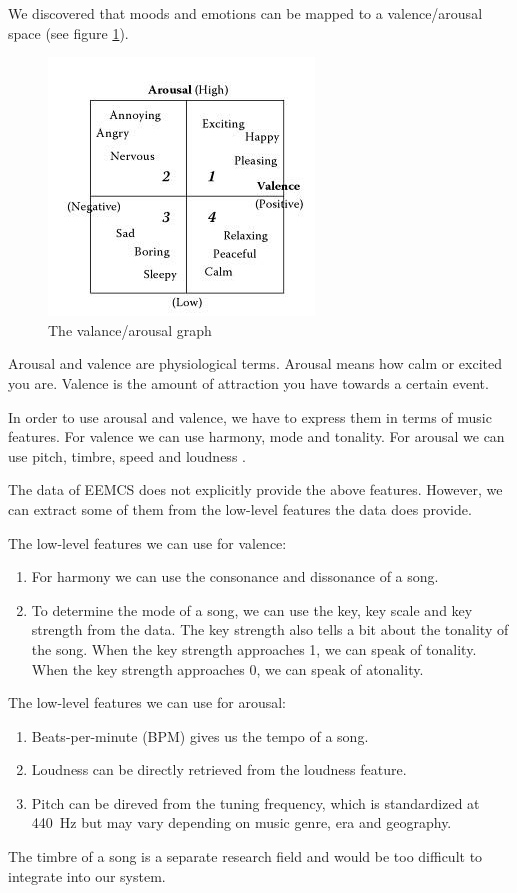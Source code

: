 \documentclass[10pt,a4paper]{article}
\begin{document}
We discovered that moods and emotions can be mapped to a valence/arousal space (see figure \ref{fig:avgraph}).

\begin{figure}[h]
\center
\includegraphics[scale=0.75]{../avgraph.jpg}
\caption{The valance/arousal graph \cite{Book}}
\endcenter
\label{fig:avgraph}

\end{figure}

Arousal and valence are physiological terms.
Arousal means how calm or excited you are.
Valence is the amount of attraction you have towards a certain event.

In order to use arousal and valence, we have to express them in terms of music features.
For valence we can use harmony, mode and tonality.
For arousal we can use pitch, timbre, speed and loudness \cite{PresentationMER}\cite{PaperME}.

\newpage

The data of EEMCS does not explicitly provide the above features. However, we can extract some of them from the low-level features the data does provide.

The low-level features we can use for valence:
\begin{enumerate}
\item For harmony we can use the consonance and dissonance of a song.
\item To determine the mode of a song, we can use the key, key scale and key strength from the data.
The key strength also tells a bit about the tonality of the song.
When the key strength approaches 1, we can speak of tonality. When the key strength approaches 0, we can speak of atonality.
\end{enumerate}
The low-level features we can use for arousal:
\begin{enumerate}
\item Beats-per-minute (BPM) gives us the tempo of a song.
\item Loudness can be directly retrieved from the loudness feature.
\item Pitch can be direved from the tuning frequency, which is standardized at \SI{440}{\hertz} but may vary depending on music genre, era and geography.
\end{enumerate}

The timbre of a song is a separate research field and would be too difficult to integrate into our system.

%
%
{}

\end{document}

